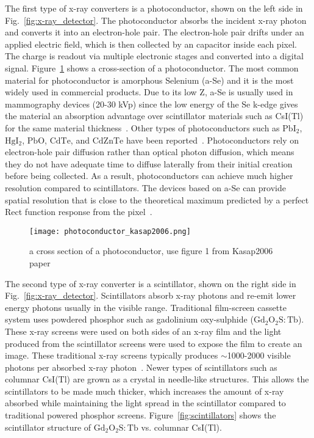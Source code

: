 The first type of x-ray converters is a photoconductor, shown on the left side in Fig.~\ref{fig:x-ray_detector}.  The photoconductor absorbs the incident x-ray photon and converts it into an electron-hole pair.  The electron-hole pair drifts under an applied electric field, which is then collected by an capacitor inside each pixel.  The charge is readout via multiple electronic stages and converted into a digital signal.  Figure~\ref{fig:photoconductor_cross_section} shows a cross-section of a photoconductor.  The most common material for photoconductor is amorphous Selenium (a-Se) and it is the most widely used in commercial products.  Due to its low Z, a-Se is usually used in mammography devices (20-30 kVp) since the low energy of the Se k-edge gives the material an absorption advantage over scintillator materials such as CsI(Tl) for the same material thickness~\citep{Yorkston2007}.  Other types of photoconductors such as $\mathrm{PbI_2}$, $\mathrm{HgI_2}$, $\mathrm{PbO}$, $\mathrm{CdTe}$, and $\mathrm{CdZnTe}$ have been reported~\citep{springer2007}.  Photoconductors rely on electron-hole pair diffusion rather than optical photon diffusion, which means they do not have adequate time to diffuse laterally from their initial creation before being collected.  As a result, photoconductors can achieve much higher resolution compared to scintillators.  The devices based on a-Se can provide spatial resolution that is close to the theoretical maximum predicted by a perfect Rect function response from the pixel~\citep{hunt5030}. 

\begin{figure}[h]
\centering
\texttt{[image: photoconductor\_kasap2006.png]}
\caption{a cross section of a photoconductor, use figure 1 from Kasap2006 paper}
\label{fig:photoconductor_cross_section}
\end{figure}

The second type of x-ray converter is a scintillator, shown on the right side in Fig.~\ref{fig:x-ray_detector}.  Scintillators absorb x-ray photons and re-emit lower energy photons usually in the visible range.  Traditional film-screen cassette system uses powdered phosphor such as gadolinium oxy-sulphide ($\mathrm{Gd_2O_2S:Tb}$).  These x-ray screens were used on both sides of an x-ray film and the light produced from the scintillator screens were used to expose the film to create an image.  These traditional x-ray screens typically produces $\sim$1000-2000 visible photons per absorbed x-ray photon~\citep{trauernicht1988, trauernicht1990}. Newer types of scintillators such as columnar CsI(Tl) are grown as a crystal in needle-like structures.  This allows the scintillators to be made much thicker, which increases the amount of x-ray absorbed while maintaining the light spread in the scintillator compared to traditional powered phosphor screens.  Figure~\ref{fig:scintillators} shows the scintillator structure of $\mathrm{Gd_2O_2S:Tb}$ vs. columnar CsI(Tl).

